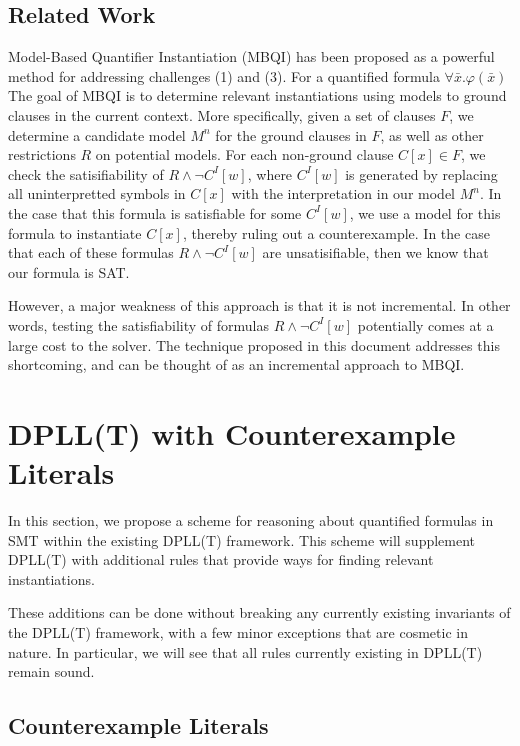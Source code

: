 \documentclass{llncs}
\begin{document}
\subsection{Related Work}

Model-Based Quantifier Instantiation (MBQI) has been proposed as a powerful method for addressing challenges (1) and (3).
For a quantified formula $\forall \bar{x}. \varphi(\bar{x})$
The goal of MBQI is to determine relevant instantiations using models to ground clauses in the current context.
More specifically, given a set of clauses $F$, we determine a candidate model $M^n$ for the ground clauses in $F$, as well as other restrictions $R$ on potential models.
For each non-ground clause $C[x] \in F$, we check the satisifiability of $R \wedge \neg C^I[w]$, where $C^I[w]$ is generated by replacing all uninterpretted symbols in $C[x]$ with the interpretation in our model $M^n$.
In the case that this formula is satisfiable for some $C^I[w]$, we use a model for this formula to instantiate $C[x]$, thereby ruling out a counterexample.
In the case that each of these formulas $R \wedge \neg C^I[w]$ are unsatisifiable, then we know that our formula is SAT.

However, a major weakness of this approach is that it is not incremental.
In other words, testing the satisfiability of formulas $R \wedge \neg C^I[w]$ potentially comes at a large cost to the solver.
The technique proposed in this document addresses this shortcoming, and can be thought of as an incremental approach to MBQI.

\section{DPLL(T) with Counterexample Literals}
\label{dpll-ce-lit}

In this section, we propose a scheme for reasoning about quantified formulas in SMT within the existing DPLL(T) framework.
This scheme will supplement DPLL(T) with additional rules that provide ways for finding relevant instantiations.

These additions can be done without breaking any currently existing invariants of the DPLL(T) framework, with a few minor exceptions that are cosmetic in nature.
In particular, we will see that all rules currently existing in DPLL(T) remain sound.

\subsection{Counterexample Literals}
\end{document}
